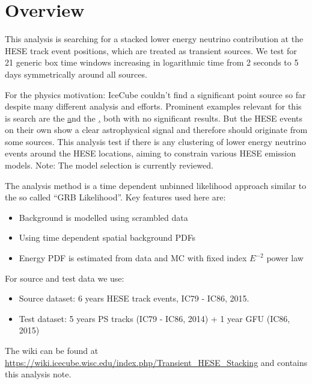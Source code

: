 

% 






\tableofcontents
\newpage


\section{Overview}
This analysis is searching for a stacked lower energy neutrino contribution at the HESE track event positions, which are treated as transient sources.
We test for 21 generic box time windows increasing in logarithmic time from 2 seconds to 5 days symmetrically around all sources.

For the physics motivation: IceCube couldn't find a significant point source so far despite many different analysis and efforts.
Prominent examples relevant for this is search are the \href{time integrated 7 year point source search} and the \href{HESE 6 year point source search}, both with no significant results.
But the HESE events on their own show a clear astrophysical signal and therefore should originate from some sources.
This analysis test if there is any clustering of lower energy neutrino events around the HESE locations, aiming to constrain various HESE emission models.
\textcolor{nordred}{Note: The model selection is currently reviewed}.

The analysis method is a time dependent unbinned likelihood approach similar to the so called \enquote{GRB Likelihood}.
Key features used here are:
\begin{itemize}
  \item Background is modelled using scrambled data
  \item Using time dependent spatial background PDFs
  \item Energy PDF is estimated from data and MC with fixed index $E^{-2}$ power law
\end{itemize}

For source and test data we use:
\begin{itemize}
  \item Source dataset: 6 years HESE track events, IC79 - IC86, 2015.
  \item Test dataset: 5 years PS tracks (IC79 - IC86, 2014) + 1 year GFU (IC86, 2015)
\end{itemize}

The wiki can be found at \url{https://wiki.icecube.wisc.edu/index.php/Transient_HESE_Stacking} and contains this analysis note.



